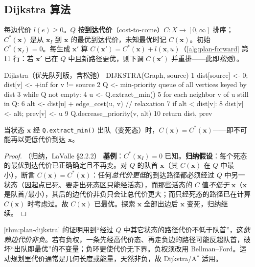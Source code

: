 \subsection{Dijkstra 算法}
\label{sec:plan-dijkstra}

每边代价 $l(e)\ge0$。$Q$ 按\textbf{到达代价}（cost-to-come）$C:X\to[0,\infty]$ 排序；$C^*(\mathbf{x})$ 是从 $\mathbf{x}_I$ 到 $\mathbf{x}$ 的最优到达代价，未知最优时记 $C(\mathbf{x})$。初始 $C^*(\mathbf{x}_I)=0$。每生成 $\mathbf{x}'$ 算 $C(\mathbf{x}')=C^*(\mathbf{x})+l(\mathbf{x},u)$（\cref{alg:plan-forward} 第 11 行：若 $\mathbf{x}'$ 已在 $Q$ 中且新路径更优，则下调 $C(\mathbf{x}')$ 并重排——此即\emph{松弛}）。

\begin{codebox}[text]{Dijkstra（优先队列版，含松弛）}
DIJKSTRA(Graph, source)
 1  dist[source] <- 0; dist[v] <- +inf for v != source
 2  Q <- min-priority queue of all vertices keyed by dist
 3  while Q not empty:
 4      u <- Q.extract_min()
 5      for each neighbor v of u still in Q:
 6          alt <- dist[u] + edge_cost(u, v)          // relaxation
 7          if alt < dist[v]:
 8              dist[v] <- alt; prev[v] <- u
 9              Q.decrease_priority(v, alt)
10  return dist, prev
\end{codebox}

\begin{theorem}\label{thm:plan-dijkstra}
当状态 $\mathbf{x}$ 经 \texttt{Q.extract\_min()} 出队（变死态）时，$C(\mathbf{x})=C^*(\mathbf{x})$——即不可能再以更低代价到达 $\mathbf{x}$。
\end{theorem}
\begin{proof}（归纳，LaValle\cite{lavalle2006planning} §2.2.2）
\textbf{基例}：$C^*(\mathbf{x}_I)=0$ 已知。\textbf{归纳假设}：每个死态的最优到达代价已正确确定且不再变。对 $Q$ 的队首 $\mathbf{x}$（其 $C(\mathbf{x})$ 在 $Q$ 中最小），断言 $C(\mathbf{x})=C^*(\mathbf{x})$：任何\emph{总代价更低}的到达路径都必须经过 $Q$ 中另一状态（因起点已死、要走出死态区只能经活态），而那些活态的 $C$ 值\emph{不低于} $\mathbf{x}$（$\mathbf{x}$ 是队首/最小），其后的边代价非负只会让总代价更大；而只经死态的路径已在计算 $C(\mathbf{x})$ 时考虑过。故 $C(\mathbf{x})$ 已最优。探索 $\mathbf{x}$ 全部出边后 $\mathbf{x}$ 变死，归纳继续。
\end{proof}

\begin{pitfall}
\cref{thm:plan-dijkstra} 的证明用到“经过 $Q$ 中其它状态的路径代价不低于队首”，这\emph{依赖边代价非负}。若有负权，一条先经高代价态、再走负边的路径可能反超队首，破坏“出队即最优”的不变量；负环更使代价无下界。负权须改用 Bellman--Ford。运动规划里代价通常是几何长度或能量，天然非负，故 Dijkstra/A$^*$ 适用。
\end{pitfall}

